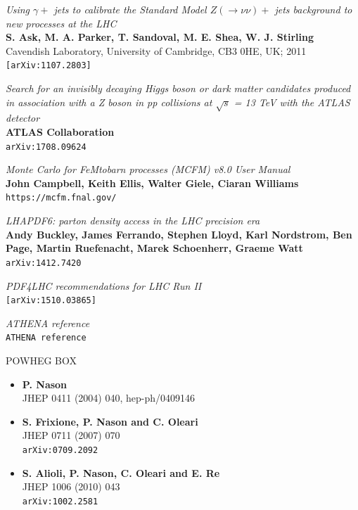 \documentclass[11pt,a4paper,final]{report}
\begin{document}
\begin{thebibliography}{9}
	\textit{Using $\gamma +$ jets to calibrate the Standard Model $Z(\rightarrow \nu\nu)+$ jets background to new processes at the LHC}\\
	\textbf{S. Ask, M. A. Parker, T. Sandoval, M. E. Shea, W. J. Stirling}\\
Cavendish Laboratory, University of Cambridge, CB3 0HE, UK; 2011\\
	\texttt{[arXiv:1107.2803]}
	
	\textit{Search for an invisibly decaying Higgs boson or dark matter candidates produced in association with a Z boson in pp collisions at $\sqrt{s}$ = 13 TeV with the ATLAS detector}\\
	\textbf{ATLAS Collaboration}\\
	\texttt{arXiv:1708.09624}

	\textit{Monte Carlo for FeMtobarn processes (MCFM) v8.0 User Manual}\\
	\textbf{John Campbell, Keith Ellis, Walter Giele, Ciaran Williams}\\
	\texttt{https://mcfm.fnal.gov/}
	
	\textit{LHAPDF6: parton density access in the LHC precision era}\\
	\textbf{Andy Buckley, James Ferrando, Stephen Lloyd, Karl Nordstrom, Ben Page, Martin Ruefenacht, Marek Schoenherr, Graeme Watt}\\
	\texttt{arXiv:1412.7420}
	
	\textit{PDF4LHC recommendations for LHC Run II}\\
	\texttt{[arXiv:1510.03865]}

	\textit{ATHENA reference}\\
	\texttt{ATHENA reference}
	
	POWHEG BOX
	\begin{itemize}
	\item \textbf{P. Nason}\\
	JHEP 0411 (2004) 040, hep-ph/0409146
	\item \textbf{S. Frixione, P. Nason and C. Oleari}\\
	JHEP 0711 (2007) 070\\
	\texttt{arXiv:0709.2092}
	\item \textbf{S. Alioli, P. Nason, C. Oleari and E. Re}\\
	JHEP 1006 (2010) 043\\ 
	\texttt{arXiv:1002.2581}
	\end{itemize}
	

\end{thebibliography}
\end{document}
